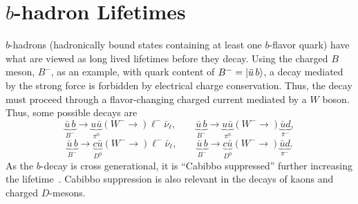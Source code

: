 \chapter{$b$-hadron Lifetimes}\label{appendix:B_hadron_lifetimes}

$b$-hadrons (hadronically bound states containing at least one $b$-flavor quark) have what are viewed as long lived lifetimes before they decay.
Using the charged $B$ meson, $B^{-}$, as an example, with quark content of $B^{-} = \Ket{\bar{u}\, b}$, a decay mediated by the strong force is forbidden by electrical charge conservation.
Thus, the decay must proceed through a flavor-changing charged current mediated by a $W$ boson.
Thus, some possible decays are
\[
 \underbrace{\bar{u}\,b}_{B^{-}} \to \underbrace{u\bar{u}}_{\pi^0} \left(W^{-} \to\right) \ell^{-} \bar{\nu}_{\ell}, \qquad \underbrace{\bar{u}\,b}_{B^{-}} \to \underbrace{u\bar{u}}_{\pi^0} \left(W^{-} 	\to \right) \underbrace{\bar{u}d}_{\pi^-},
\]
%
\[
 \underbrace{\bar{u}\,b}_{B^{-}} \to \underbrace{c\bar{u}}_{D^0} \left(W^{-} \to \right) \ell^{-} \bar{\nu}_{\ell}, \qquad \underbrace{\bar{u}\,b}_{B^{-}} \to \underbrace{c\bar{u}}_{D^0} \left(W^{-} \to \right) \underbrace{\bar{u}d}_{\pi^-}.
\]
As the $b$-decay is cross generational, it is ``Cabibbo suppressed'' further increasing the lifetime~\cite{Vaandering}.
Cabibbo suppression is also relevant in the decays of kaons and charged $D$-mesons.

